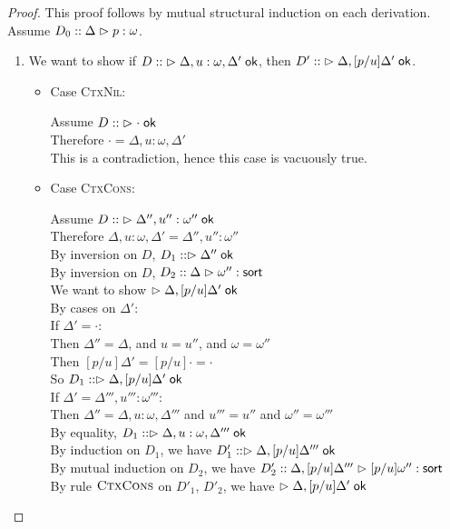 \begin{proof}
This proof follows by mutual structural induction on each derivation. 
Assume $D_0 :: \judgeA{p}{\omega}$. 

\begin{enumerate}
\item We want to show if $D  ::\; \judgeACtx{\Delta, u:\omega, \Delta'}$, then  
                         $D' ::\; \judgeACtx{\Delta, [p/u]\Delta'}$. 
  \begin{itemize}
  \item Case \textsc{CtxNil}: 
    \begin{tabbedproof}
      \oo Assume $D ::\; \judgeACtx{\cdot}$ \\
      \ooo Therefore $\cdot = \Delta, u:\omega, \Delta'$ \\
      \ooo This is a contradiction, hence this case is vacuously true. 
    \end{tabbedproof}

  \item Case \textsc{CtxCons}: 
    \begin{tabbedproof}
      \oo Assume $D ::\; \judgeACtx{\Delta'', u'':\omega''}$ \\
      \ooo Therefore $\Delta, u:\omega, \Delta' = \Delta'', u'':\omega''$ \\
      \ooo By inversion on $D$, $D_1 :: \judgeACtx{\Delta''}$ \\
      \ooo By inversion on $D$, $D_2 :: \judgeSort{\omega''}$ \\
      \ooo We want to show $\judgeACtx{\Delta, [p/u]\Delta'}$ \\
      \ooo By cases on $\Delta'$: \\
      \oooo If $\Delta' = \cdot$: \\
      \ooooo Then $\Delta'' = \Delta$, and $u = u''$, and $\omega = \omega''$ \\
      \ooooo Then $[p/u]\Delta' = [p/u]\cdot = \cdot$ \\
      \ooooo So $D_1 :: \judgeACtx{\Delta, [p/u]\Delta'}$ \\
      \oooo If $\Delta' = \Delta''', u''':\omega'''$:\\
      \ooooo Then $\Delta'' = \Delta, u:\omega, \Delta'''$ and $u''' = u''$ and $\omega'' = \omega'''$ \\ 
      \ooooo By equality, $D_1 :: \judgeACtx{\Delta, u:\omega, \Delta'''}$ \\
      \ooooo By induction on $D_1$, we have $D'_1 :: \judgeACtx{\Delta, [p/u]\Delta'''}$ \\ 
      \ooooo By mutual induction on $D_2$, we have 
                 $D'_2 :: \judgeSort[{\Delta, [p/u]\Delta'''}]{[p/u]\omega''}$ \\ 
      \ooooo By rule $\textsc{CtxCons}$ on $D'_1$, $D'_2$, we have 
                 $\judgeACtx{\Delta, [p/u]\Delta'}$ \\
    \end{tabbedproof}
  \end{itemize}


\end{enumerate}
\end{proof}
